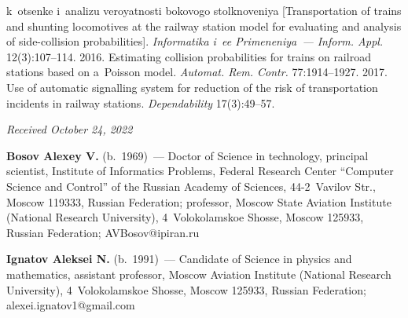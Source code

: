 \begin{multicols}{2}
{{\begin{thebibliography}{99}
k~otsen\-ke i~ana\-li\-zu ve\-ro\-yat\-nosti bo\-ko\-vo\-go stolk\-no\-ve\-niya [Transportation of trains and 
shunting locomotives at the railway station model for evaluating and analysis of side-collision probabilities]. 
\textit{Informatika i~ee Primeneniya~--- Inform. Appl.} 
12(3):107--114.
 2016. Estimating collision 
probabilities for trains on railroad stations based on a~Poisson model. \textit{Automat. 
Rem. Contr.} 77:1914--1927.
 2017. 
Use of automatic signalling system for reduction of the risk of transportation incidents in 
railway stations. \textit{Dependability} 17(3):49--57.
\end{thebibliography}

 }
 }

\end{multicols}

\vspace*{-6pt}

\hfill{\small\textit{Received October 24, 2022}}

\Contr

\noindent
\textbf{Bosov Alexey V.} (b.\ 1969)~--- Doctor of Science in technology, principal 
scientist, Institute of Informatics Problems, Federal Research Center ``Computer 
Science and Control'' of the Russian Academy of Sciences, 44-2~Vavilov Str., Moscow 
119333, Russian Federation; professor, Moscow State Aviation Institute (National 
Research University), 4~Volokolamskoe Shosse, Moscow 125933, Russian Federation; 
\mbox{AVBosov@ipiran.ru}

\vspace*{3pt}

\noindent
\textbf{Ignatov Aleksei N.} (b.\ 1991)~--- Candidate of Science in physics and 
mathematics, assistant professor, Moscow Aviation Institute (National Research 
University), 4~Volokolamskoe Shosse, Moscow 125933, Russian Federation; 
\mbox{alexei.ignatov1@gmail.com}


  
\label{end\stat}

\renewcommand{\bibname}{\protect\rm Литература} 